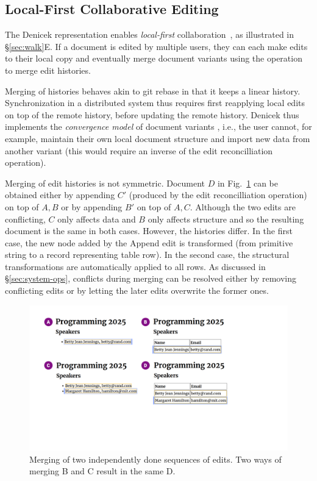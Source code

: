 \documentclass[sigconf]{acmart}
\newcommand{\ident}[1]{{\sffamily #1}}
\begin{document}
\subsection{Local-First Collaborative Editing}
\label{sec:impl-collab}

The Denicek representation enables \emph{local-first} collaboration~\cite{kleppmann-2019-local},
as illustrated in \S\ref{sec:walk}E. If a document is edited by multiple users, they can
each make edits to their local copy and eventually merge document variants using the operation to
merge edit histories.

Merging of histories behaves akin to git rebase in that it keeps a linear history. Synchronization
in a distributed system thus requires first reapplying local edits on top of the remote history,
before updating the remote history. Denicek thus implements the \emph{convergence model} of
document variants \cite{edwards-2025-schema}, i.e., the user cannot, for example, maintain their
own local document structure and import new data from another variant (this would require an
inverse of the edit reconcilliation operation).

Merging of edit histories is not symmetric. Document $D$ in Fig.~\ref{fig:merging}
can be obtained either by appending $C'$ (produced by the edit reconcilliation operation)
on top of $A,B$ or by appending $B'$ on top of $A,C$. Although the two edits are conflicting,
$C$ only affects data and $B$ only affects structure and so the resulting document is the same
in both cases. However, the histories differ. In the first case, the new node added by the
\ident{Append} edit is transformed (from primitive string to a record representing table row).
In the second case, the structural transformations are automatically applied to all rows.
As discussed in \S\ref{sec:system-ops}, conflicts during merging can be resolved either by
removing conflicting edits or by letting the later edits overwrite the former ones.


\begin{figure}[t]
\includegraphics[width=0.9\columnwidth,clip,trim=1.7cm 6cm 7.8cm 1.5cm]{fig/merging.pdf}
\vspace{-0.5em}
\caption{Merging of two independently done sequences of edits. Two ways of merging B and C result in the same D.}
\label{fig:merging}
\vspace{-0.5em}
\end{figure}
\end{document}
